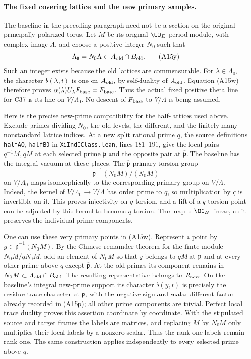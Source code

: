 \documentclass[11pt]{article}
\theoremstyle{definition}\newtheorem{definition}[theorem]{Definition}\newtheorem{remark}[theorem]{Remark}
\begin{document}
\paragraph{The fixed covering lattice and the new primary samples.}
The baseline in the preceding paragraph need not be a section on
the original principally polarized torus.  Let $M$ be its original
$\OO_E$-period module, with complex image $\Lambda$, and choose a
positive integer $N_0$ such that
\[
 \Lambda_0=N_0\Lambda\subset A_{\rm old}\cap B_{\rm old}.
 \tag{A15y}
\]
Such an integer exists because the old lattices are commensurable.
For $\lambda\in\Lambda_0$, the character $b(\lambda,t)$ is one
on $A_{\rm old}$, by self-duality of $A_{\rm old}$.
Equation (A15w) therefore proves
$\alpha(\lambda)U_\lambda F_{\rm base}=F_{\rm base}$.
Thus the actual fixed positive theta line for C37 is its line on
$V/\Lambda_0$.  No descent of $F_{\rm base}$ to $V/\Lambda$
is being assumed.

Here is the precise new-prime compatibility for the half-lattices
used above.  Exclude primes dividing $N_0$, the old levels, the
different, and the finitely many nonstandard lattice indices.
At a new split rational prime $q$, the source definitions
\texttt{halfAO}, \texttt{halfBO} in
\texttt{XiIndCClass.lean}, lines 181--191, give the local pairs
$q^{-1}M,qM$ at each selected prime $\mathfrak p$ and the
opposite pair at $\overline{\mathfrak p}$.
The baseline has the integral vacuum at these places.
The $\overline{\mathfrak p}$-primary torsion group
\[
 \overline{\mathfrak p}^{-1}(N_0M)/(N_0M)
\]
on $V/\Lambda_0$ maps isomorphically to the corresponding
primary group on $V/\Lambda$.
Indeed, the kernel of $V/\Lambda_0\to V/\Lambda$ has order
prime to $q$, so multiplication by $q$ is invertible on it.
This proves injectivity on $q$-torsion, and a lift of a
$q$-torsion point can be adjusted by this kernel to become
$q$-torsion.  The map is $\OO_E$-linear, so it preserves the
individual prime components.

One can use these very primary points in (A15w).
Represent a point by $y\in\overline{\mathfrak p}^{-1}(N_0M)$.
By the Chinese remainder theorem for the finite module
$N_0M/qN_0M$, add an element of $N_0M$ so that $y$ belongs
to $qM$ at $\mathfrak p$ and at every other prime above $q$
except $\overline{\mathfrak p}$.  At the old primes its
component remains in $N_0M\subset A_{\rm old}\cap B_{\rm old}$.
The resulting representative belongs to $B_{\rm new}$.
On the baseline's integral new-prime support its character
$b(y,t)$ is precisely the residue trace character at
$\mathfrak p$, with the negative sign and scalar different
factor already recorded in (A15p); all other prime components
are trivial.  Perfect local trace duality proves this assertion
coordinate by coordinate.  With the stipulated source and target
frames the labels are matrices, and replacing $M$ by $N_0M$
only multiplies their local labels by a nonzero scalar.  Thus the
rank-one labels remain rank one.  The same construction applies
independently to every selected prime above $q$.
\end{document}
